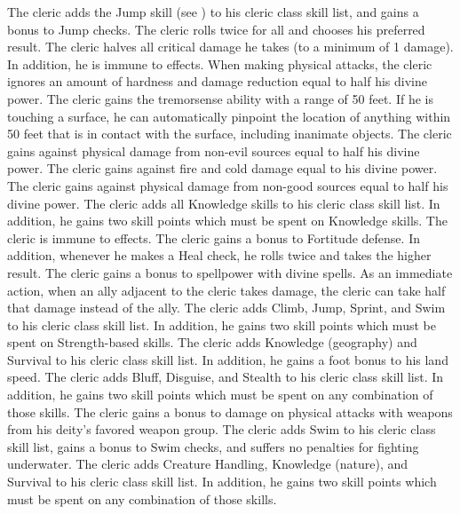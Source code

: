             The cleric adds the Jump skill (see ) to his cleric class skill list, and gains a  bonus to Jump checks.
            The cleric rolls twice for all  and chooses his preferred result.
            The cleric halves all critical damage he takes (to a minimum of 1 damage).
            In addition, he is immune to  effects.
            When making physical attacks, the cleric ignores an amount of hardness and damage reduction equal to half his divine power.
            The cleric gains the tremorsense ability with a range of 50 feet.
            If he is touching a surface, he can automatically pinpoint the location of anything within 50 feet that is in contact with the surface, including inanimate objects.
            The cleric gains  against physical damage from non-evil sources equal to half his divine power.
            The cleric gains  against fire and cold damage equal to his divine power.
            The cleric gains  against physical damage from non-good sources equal to half his divine power.
            The cleric adds all Knowledge skills to his cleric class skill list.
            In addition, he gains two skill points which must be spent on Knowledge skills.
            The cleric is immune to  effects.
            The cleric gains a  bonus to Fortitude defense.
            In addition, whenever he makes a Heal check, he rolls twice and takes the higher result.
            The cleric gains a  bonus to spellpower with divine spells.
            As an immediate action, when an ally adjacent to the cleric takes damage, the cleric can take half that damage instead of the ally.
            The cleric adds Climb, Jump, Sprint, and Swim to his cleric class skill list.
            In addition, he gains two skill points which must be spent on Strength-based skills.
            The cleric adds Knowledge (geography) and Survival to his cleric class skill list.
            In addition, he gains a  foot bonus to his land speed.
            The cleric adds Bluff, Disguise, and Stealth to his cleric class skill list.
            In addition, he gains two skill points which must be spent on any combination of those skills.
            The cleric gains a  bonus to damage on physical attacks with weapons from his deity's favored weapon group.
            The cleric adds Swim to his cleric class skill list, gains a  bonus to Swim checks, and suffers no penalties for fighting underwater.
            The cleric adds Creature Handling, Knowledge (nature), and Survival to his cleric class skill list.
            In addition, he gains two skill points which must be spent on any combination of those skills.

